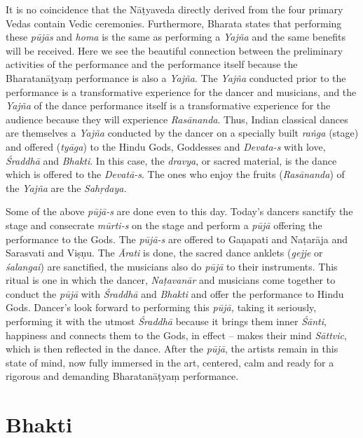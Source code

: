 It is no coincidence that the Nāṭyaveda directly derived from the four primary Vedas contain Vedic ceremonies. Furthermore, Bharata states that performing these \textit{pūjās} and \textit{homa} is the same as performing a \textit{Yajña} and the same benefits will be received. Here we see the beautiful connection between the preliminary activities of the performance and the performance itself because the Bharatanāṭyaṃ performance is also a \textit{Yajña}. The \textit{Yajña} conducted prior to the performance is a transformative experience for the dancer and musicians, and the \textit{Yajña} of the dance performance itself is a transformative experience for the audience because they will experience \textit{Rasānanda}. Thus, Indian classical dances are themselves a \textit{Yajña} conducted by the dancer on a specially built \textit{raṅga} (stage) and offered (\textit{tyāga}) to the Hindu Gods, Goddesses and \textit{Devata-s} with love, \textit{Śraddhā }and \textit{Bhakti}. In this case, the \textit{dravya}, or sacred material, is the dance which is offered to the \textit{Devatā-s}. The ones who enjoy the fruits (\textit{Rasānanda}) of the \textit{Yajña} are the\textit{ Sahṛdaya.}

Some of the above \textit{pūjā-s} are done even to this day. Today’s dancers sanctify the stage and consecrate \textit{mūrti-s} on the stage and perform a \textit{pūjā} offering the performance to the Gods. The \textit{pūjā-s }are offered to Gaṇapati and Naṭarāja and Sarasvati and Viṣṇu. The \textit{Ārati} is done, the sacred dance anklets (\textit{gejje} or \textit{śalangai}) are sanctified, the musicians also do \textit{pūjā }to their instruments. This ritual is one in which the dancer, \textit{Naṭavanār} and musicians come together to conduct the \textit{pūjā }with \textit{Śraddhā} and \textit{Bhakti} and offer the performance to Hindu Gods. Dancer’s look forward to performing this \textit{pūjā,} taking it seriously, performing it with the utmost \textit{Śraddhā} because it brings them inner \textit{Śānti}, happiness and connects them to the Gods, in effect – makes their mind \textit{Sāttvic}, which is then reflected in the dance. After the \textit{pūjā}, the artists remain in this state of mind, now fully immersed in the art, centered, calm and ready for a rigorous and demanding Bharatanāṭyaṃ performance.


\section*{Bhakti}

